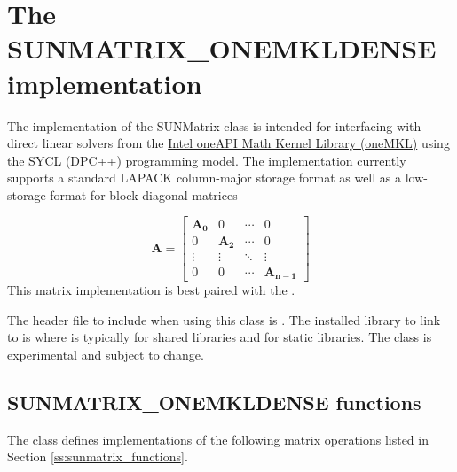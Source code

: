 \section{The SUNMATRIX\_ONEMKLDENSE implementation}
\label{ss:sunmat_onemkldense}

The  implementation of the SUNMatrix class is
intended for interfacing with direct linear solvers from the
\href{https://software.intel.com/content/www/us/en/develop/tools/oneapi/components/onemkl.html}{Intel oneAPI Math Kernel Library (oneMKL)}
using the SYCL (DPC++) programming model. The implementation currently supports
a standard LAPACK column-major storage format as well as a low-storage format
for block-diagonal matrices

\begin{equation*}
  \mathbf{A} =
  \begin{bmatrix}
    \mathbf{A_0} & 0            & \cdots & 0 \\
    0            & \mathbf{A_2} & \cdots & 0 \\
    \vdots       & \vdots       & \ddots & \vdots \\
    0            & 0            & \cdots & \mathbf{A_{n-1}}
  \end{bmatrix}
\end{equation*}
This matrix implementation is best paired with the 
.

The header file to include when using this class is
. The installed library to link to is
 where  is
typically  for shared libraries and  for static libraries.
\newline
\newline
{\warn}The  class is experimental and subject to
change.

\subsection{SUNMATRIX\_ONEMKLDENSE functions}
\label{ss:sunmat_onemkldense_functions}

The  class defines implementations of the following
matrix operations listed in Section \ref{ss:sunmatrix_functions}.

